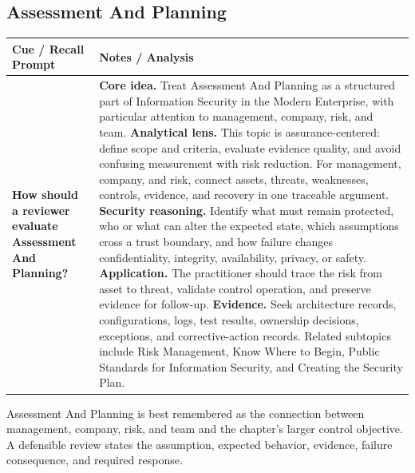 \documentclass[11pt]{article}
\newcommand{\CornellHeader}{%
\rowcolor{Navy}\color{white}\bfseries Cue / Recall Prompt & \color{white}\bfseries Notes / Analysis\\\hline}
\newcommand{\CornellRow}[2]{%
\cellcolor{CueGray}\RaggedRight\textbf{#1} & \RaggedRight #2\\\hline}
\begin{document}
\subsection*{Assessment And Planning}
\begin{longtable}{>{\RaggedRight\arraybackslash}p{}|>{\RaggedRight\arraybackslash}p{}}
\CornellHeader
\CornellRow{How should a reviewer evaluate Assessment And Planning?}{\textbf{Core idea.} Treat Assessment And Planning as a structured part of Information Security in the Modern Enterprise, with particular attention to management, company, risk, and team. \textbf{Analytical lens.} This topic is assurance-centered: define scope and criteria, evaluate evidence quality, and avoid confusing measurement with risk reduction. For management, company, and risk, connect assets, threats, weaknesses, controls, evidence, and recovery in one traceable argument. \textbf{Security reasoning.} Identify what must remain protected, who or what can alter the expected state, which assumptions cross a trust boundary, and how failure changes confidentiality, integrity, availability, privacy, or safety. \textbf{Application.} The practitioner should trace the risk from asset to threat, validate control operation, and preserve evidence for follow-up. \textbf{Evidence.} Seek architecture records, configurations, logs, test results, ownership decisions, exceptions, and corrective-action records. Related subtopics include Risk Management, Know Where to Begin, Public Standards for Information Security, and Creating the Security Plan.}
\end{longtable}
\begin{topicsummary}
Assessment And Planning is best remembered as the connection between management, company, risk, and team and the chapter's larger control objective. A defensible review states the assumption, expected behavior, evidence, failure consequence, and required response.
\end{topicsummary}
\end{document}
